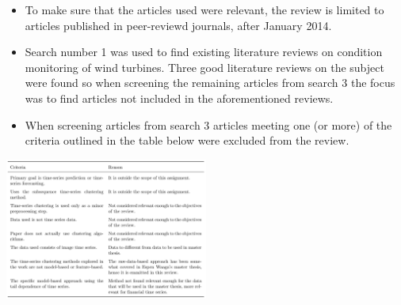 \documentclass[18pt, a3paper, portrait]{tikzposter}
\begin{document}
{
    \begin{itemize}
        \item To make sure that the articles used were relevant, the review is limited to articles published in peer-reviewd journals, after January 2014.
        \item Search number 1 was used to find existing literature reviews on condition monitoring of wind turbines. Three good literature reviews on the subject were found so when screening the remaining articles from search 3 the focus was to find articles not included in the aforementioned reviews.
        \item When screening articles from search 3 articles meeting one (or more) of the criteria outlined in the table below were excluded from the review.
    \end{itemize}

    \begin{tikzfigure}
        \includegraphics[width=0.5\textwidth]{images/exclusion_criteria_table.png}
    \end{tikzfigure}
}
\end{document}
